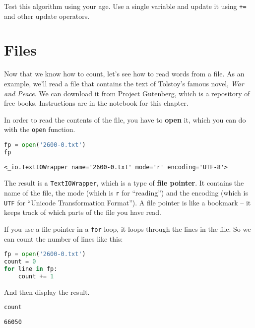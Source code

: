 Test this algorithm using your age. Use a single variable and update it
using \passthrough{\lstinline!+=!} and other update operators.

\section{Files}\label{files}

Now that we know how to count, let's see how to read words from a file.
As an example, we'll read a file that contains the text of Tolstoy's
famous novel, \emph{War and Peace}. We can download it from Project
Gutenberg, which is a repository of free books. Instructions are in the
notebook for this chapter.

In order to read the contents of the file, you have to \textbf{open} it,
which you can do with the \passthrough{\lstinline!open!} function.

\begin{lstlisting}[language=Python,style=source]
fp = open('2600-0.txt')
fp
\end{lstlisting}

\begin{lstlisting}[style=output]
<_io.TextIOWrapper name='2600-0.txt' mode='r' encoding='UTF-8'>
\end{lstlisting}

The result is a \passthrough{\lstinline!TextIOWrapper!}, which is a type
of \textbf{file pointer}. It contains the name of the file, the mode
(which is \passthrough{\lstinline!r!} for ``reading'') and the encoding
(which is \passthrough{\lstinline!UTF!} for ``Unicode Transformation
Format''). A file pointer is like a bookmark -- it keeps track of which
parts of the file you have read.

If you use a file pointer in a \passthrough{\lstinline!for!} loop, it
loops through the lines in the file. So we can count the number of lines
like this:

\begin{lstlisting}[language=Python,style=source]
fp = open('2600-0.txt')
count = 0
for line in fp:
    count += 1
\end{lstlisting}

And then display the result.

\begin{lstlisting}[language=Python,style=source]
count
\end{lstlisting}

\begin{lstlisting}[style=output]
66050
\end{lstlisting}

